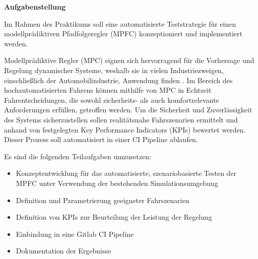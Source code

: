 \noindent\textbf{Aufgabenstellung}\smallskip

\noindent Im Rahmen des Praktikums soll eine automatisierte Teststrategie für einen modellprädiktiven Pfadfolgeregler (MPFC) konzeptioniert und implementiert werden.

Modellprädiktive Regler (MPC) eignen sich hervorragend für die Vorhersage und Regelung dynamischer Systeme, weshalb sie in vielen Industriezweigen, einschließlich der Automobilindustrie, Anwendung finden \cite{adamy2014}. Im Bereich des hochautomatisierten Fahrens können mithilfe von MPC in Echtzeit Fahrentscheidungen, die sowohl sicherheits- als auch komfortrelevante Anforderungen erfüllen, getroffen werden. Um die Sicherheit und Zuverlässigkeit des Systems sicherzustellen sollen realitätsnahe Fahrszenarien ermittelt und anhand von festgelegten Key Performance Indicators (KPIs) bewertet werden. Dieser Prozess soll automatisiert in einer CI Pipeline ablaufen.\medskip

\noindent Es sind die folgenden Teilaufgaben umzusetzen:
\begin{itemize}
    \item Konzeptentwicklung für das automatisierte, szenariobasierte Testen der MPFC unter Verwendung der bestehenden Simulationsumgebung
    \item Definition und Parametrierung geeigneter Fahrszenarien
    \item Definition von KPIs zur Beurteilung der Leistung der Regelung
    \item Einbindung in eine Gitlab CI Pipeline
    \item Dokumentation der Ergebnisse
\end{itemize}
